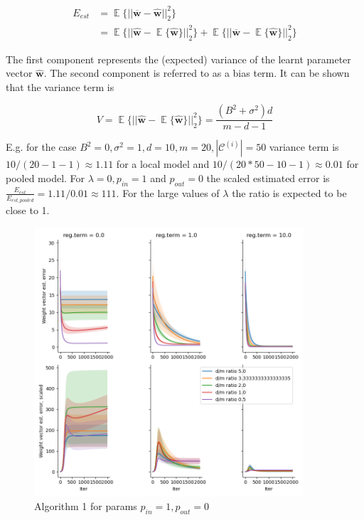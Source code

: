 \documentclass{article}
\begin{document}
\begin{equation}
\begin{split}
E_{est} & = \mathop{\mathbb{E}}\{||\mathbf{\overline{w}} - \mathbf{\widehat{w}}||^2_2\} \\
& = \mathop{\mathbb{E}}\{||\mathbf{\widehat{w}}- \mathop{\mathbb{E}}\{\mathbf{\widehat{w}}\}||^2_2\} + 
\mathop{\mathbb{E}}\{||\mathbf{\overline{w}} - \mathop{\mathbb{E}}\{\mathbf{\widehat{w}}\}||^2_2\}
\end{split}
\end{equation}

The first component represents the (expected) variance of the learnt parameter vector $\mathbf{\widehat{w}}$. The second component is referred to as a bias term. It can be shown that the variance term is

\begin{equation} 
V = \mathop{\mathbb{E}}\{||\mathbf{\widehat{w}}- \mathop{\mathbb{E}}\{\mathbf{\widehat{w}}\}||^2_2\} = \frac{(B^2 + \sigma^2)d}{m-d-1}
\end{equation}

E.g. for the case $B^2=0, \sigma^2=1, d=10, m=20, |\mathcal{C}^{(i)}|=50$ variance term is $10/(20-1-1)  \approx 1.11$ for a local model and  $10/(20*50-10-1)  \approx 0.01$ for pooled model.
For $\lambda = 0, p_{in}=1$ and $p_{out}=0$ the scaled estimated error is $\frac{E_{est}}{E_{est\_pooled}} = 1.11/0.01 \approx 111$. For the large values of $\lambda$ the ratio is expected to be close to 1.

\begin{figure}[h]
\includegraphics[width=10cm]{Linreg_Torch_594391_est_error.png}
\caption{Algorithm 1 for params $p_{in}=1, p_{out}=0$}
\end{figure}
\end{document}
